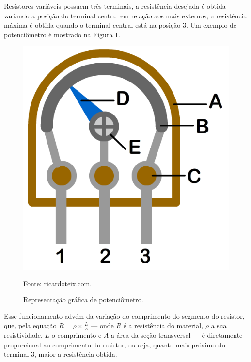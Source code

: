 \documentclass[12pt]{article}
\begin{document}
    Resistores variáveis possuem três terminais, a resistência desejada é obtida variando a posição do terminal central em relação aos mais externos, a resistência máxima é obtida quando o terminal central está na posição 3. Um exemplo de potenciômetro é mostrado na Figura \ref{fig:potenciometro}.

    \begin{figure}[H]
        \centering
        \begin{minipage}{0.4\textwidth}
            \centering
            \caption{Representação gráfica de potenciômetro.}
            \includegraphics[width=\textwidth]{external-figures/resistor-variavel.png}
            \raggedright \footnotesize Fonte: ricardoteix.com.
            \label{fig:potenciometro}
        \end{minipage}
    \end{figure}
    
    Esse funcionamento advém da variação do comprimento do segmento do resistor, que, pela equação $R = \rho\times\frac{L}{A}$ --- onde $R$ é a resistência do material, $\rho$ a sua resistividade, $L$ o comprimento e $A$ a área da seção transversal --- é diretamente proporcional ao comprimento do resistor, ou seja, quanto mais próximo do terminal 3, maior a resistência obtida.
\end{document}
